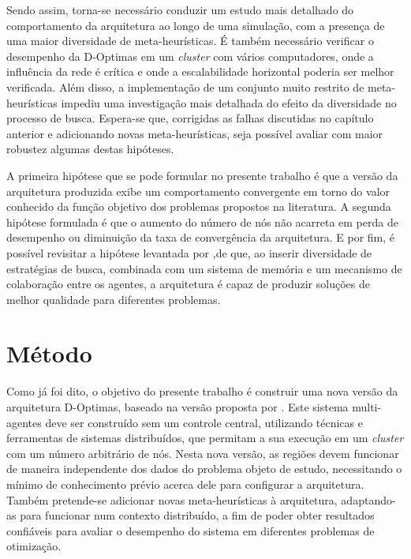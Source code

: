 Sendo assim, torna-se necessário conduzir um estudo mais  detalhado do comportamento da arquitetura ao longo de uma simulação, com a presença de uma maior diversidade de meta-heurísticas. É também necessário verificar o desempenho da D-Optimas em um \textit{cluster} com vários computadores, onde a influência da rede é crítica e onde a escalabilidade horizontal poderia ser melhor verificada. Além disso, a implementação de um conjunto muito restrito de meta-heurísticas impediu uma investigação mais detalhada do efeito da diversidade no processo de busca. Espera-se que, corrigidas as falhas discutidas no capítulo anterior e adicionando novas meta-heurísticas, seja possível avaliar com maior robustez algumas destas hipóteses. 

A primeira hipótese que se pode formular no presente trabalho é que a versão da arquitetura produzida exibe um comportamento convergente em torno do valor conhecido da função objetivo dos problemas propostos na literatura. A segunda hipótese formulada é que o aumento do número de nós não acarreta em perda de desempenho ou diminuição da taxa de convergência da arquitetura. E por fim, é possível revisitar a hipótese levantada por ,de que, ao inserir diversidade de estratégias
de busca, combinada com um sistema de memória e um mecanismo de colaboração entre
os agentes, a arquitetura é capaz de produzir soluções de melhor qualidade para diferentes problemas.


\section{Método}
\label{sec:metodo}

Como já foi dito, o objetivo do presente trabalho é construir uma nova versão da arquitetura  D-Optimas, baseado na versão proposta por . Este sistema multi-agentes deve ser construído sem um controle central, utilizando técnicas e ferramentas de sistemas distribuídos, que permitam a sua execução em um \textit{cluster} com um número arbitrário de nós. Nesta nova versão, as regiões devem funcionar de maneira independente dos dados do problema objeto de estudo, necessitando o mínimo de conhecimento prévio acerca dele para configurar a arquitetura. Também pretende-se adicionar novas meta-heurísticas à arquitetura, adaptando-as para funcionar num contexto distribuído, a fim de poder obter resultados confiáveis para avaliar o desempenho do sistema em diferentes problemas de otimização. 

